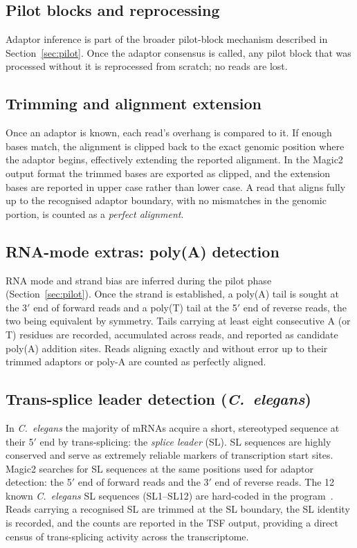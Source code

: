 \documentclass[11pt]{article}
\begin{document}
\subsection{Pilot blocks and reprocessing}
\label{sec:adapter_pilot}

Adaptor inference is part of the broader pilot-block mechanism
described in Section~\ref{sec:pilot}.
Once the adaptor consensus is called, any pilot block that was
processed without it is reprocessed from scratch; no reads are lost.

\subsection{Trimming and alignment extension}
\label{sec:trimming}

Once an adaptor is known, each read's overhang is compared to it.
If enough bases match, the alignment is clipped back to the exact
genomic position where the adaptor begins, effectively extending the
reported alignment.
In the Magic2 output format the trimmed bases are exported as clipped,
and the extension bases are reported in upper case rather than lower
case.
A read that aligns fully up to the recognised adaptor boundary, with
no mismatches in the genomic portion, is counted as a
\emph{perfect alignment}.

\subsection{RNA-mode extras: poly(A) detection}
\label{sec:polya}

RNA mode and strand bias are inferred during the pilot phase
(Section~\ref{sec:pilot}).
Once the strand is established, a
poly(A) tail is sought at the 3$'$ end of forward reads and a poly(T)
tail at the 5$'$ end of reverse reads, the two being equivalent by
symmetry.
Tails carrying at least eight consecutive A (or T) residues are
recorded, accumulated across reads, and reported as candidate poly(A)
addition sites.
Reads aligning exactly and without error up to their trimmed
adaptors or poly-A
are counted as perfectly aligned.

\subsection{Trans-splice leader detection (\textit{C.~elegans})}
\label{sec:tsl}

In \textit{C.~elegans} the majority of mRNAs acquire a short,
stereotyped sequence at their 5$'$ end by trans-splicing: the
\emph{splice leader} (SL).
SL sequences are highly conserved and serve as extremely reliable
markers of transcription start sites.
Magic2 searches for SL sequences at the same positions used for
adaptor detection: the 5$'$ end of forward reads and the 3$'$ end
of reverse reads.
The 12 known \textit{C.~elegans} SL sequences (SL1--SL12) are
hard-coded in the program~\citep{blumenthal2002}.
Reads carrying a recognised SL are trimmed at the SL boundary,
the SL identity is recorded, and the counts are reported in the
TSF output, providing a direct census of trans-splicing activity
across the transcriptome.
\end{document}
